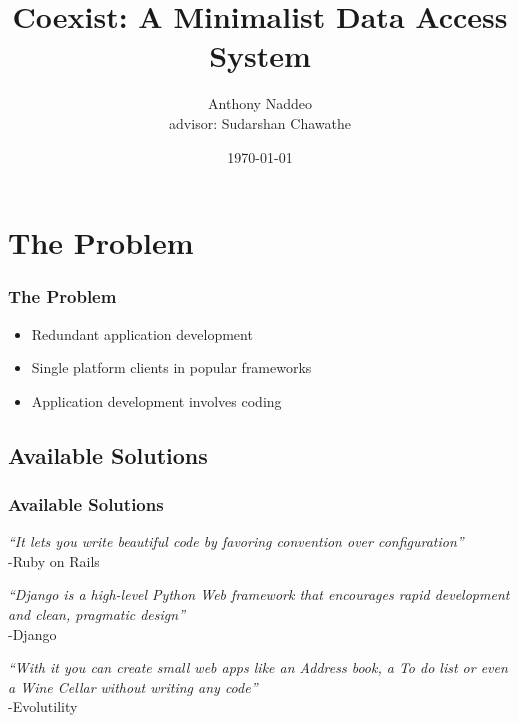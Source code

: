 \documentclass[]{beamer}
\title[]{Coexist: A Minimalist Data Access System}
\author[]{Anthony Naddeo \\ advisor: Sudarshan Chawathe}
\date{\today}
\begin{document}
\begin{frame}
\titlepage

\end{frame}


\section{The Problem}

\begin{frame}
\frametitle{The Problem}

\begin{itemize}
  \item Redundant application development
  \item Single platform clients in popular frameworks
  \item Application development involves coding
\end{itemize}


\end{frame}





\subsection{Available Solutions}

\begin{frame}
\frametitle{Available Solutions}

\emph{``It lets you write beautiful code by favoring convention over
configuration''} \\
\hfill -Ruby on Rails \\
\hfill

\emph{``Django is a high-level Python Web framework that encourages rapid development
and clean, pragmatic design''} \\
\hfill -Django \\
\hfill

\emph{``With it you can create small web apps like an Address book, a To do list
or even a Wine Cellar without writing any code''} \\
\hfill -Evolutility \\

\note{

}

\end{frame}
\end{document}
